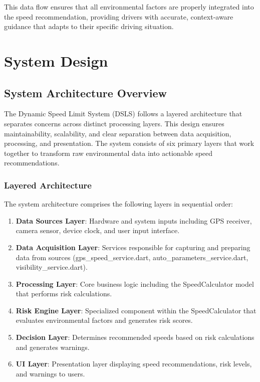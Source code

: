 This data flow ensures that all environmental factors are properly integrated into the speed recommendation, providing drivers with accurate, context-aware guidance that adapts to their specific driving situation.

\chapter{System Design}\label{chapter:SystemDesign}
\section{System Architecture Overview}
The Dynamic Speed Limit System (DSLS) follows a layered architecture that separates concerns across distinct processing layers. This design ensures maintainability, scalability, and clear separation between data acquisition, processing, and presentation. The system consists of six primary layers that work together to transform raw environmental data into actionable speed recommendations.

\subsection{Layered Architecture}
The system architecture comprises the following layers in sequential order:

\begin{enumerate}
    \item \textbf{Data Sources Layer}: Hardware and system inputs including GPS receiver, camera sensor, device clock, and user input interface.
    \item \textbf{Data Acquisition Layer}: Services responsible for capturing and preparing data from sources (gps\_speed\_service.dart, auto\_parameters\_service.dart, visibility\_service.dart).
    \item \textbf{Processing Layer}: Core business logic including the SpeedCalculator model that performs risk calculations.
    \item \textbf{Risk Engine Layer}: Specialized component within the SpeedCalculator that evaluates environmental factors and generates risk scores.
    \item \textbf{Decision Layer}: Determines recommended speeds based on risk calculations and generates warnings.
    \item \textbf{UI Layer}: Presentation layer displaying speed recommendations, risk levels, and warnings to users.
\end{enumerate}

